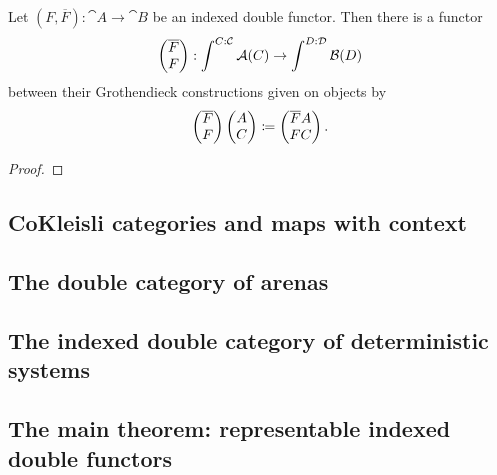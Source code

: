 \documentclass[DynamicalBook]{subfiles}
\begin{document}
\begin{proposition}\label{prop.groth_construction_functoriality}
  Let $(F, \overline{F}) : \cat{A} \to \cat{B}$ be an indexed double functor.
  Then there is a functor
  $$\begin{pmatrix}{\overline{F}} \\ {F} \end{pmatrix} : \int^{C : \mathcal{C}} \mathcal{A}(C) \to \int^{D :
    \mathcal{D}} \mathcal{B}(D)$$
  between their Grothendieck constructions given on objects by
  $$\begin{pmatrix}{\overline{F}} \\ {F} \end{pmatrix} \begin{pmatrix}{A} \\ {C} \end{pmatrix} \coloneqq \begin{pmatrix}{\overline{F}A} \\ {FC} \end{pmatrix}.$$
\end{proposition}
\begin{proof}

\end{proof}



\subsection{CoKleisli categories and maps with context}\label{sec.context_indexed_cat}

\subsection{The double category of arenas}

\subsection{The indexed double category of deterministic systems}
\label{sec.indexed_double_category_of_systems}

\subsection{The main theorem: representable indexed double functors}
  
\end{document}
